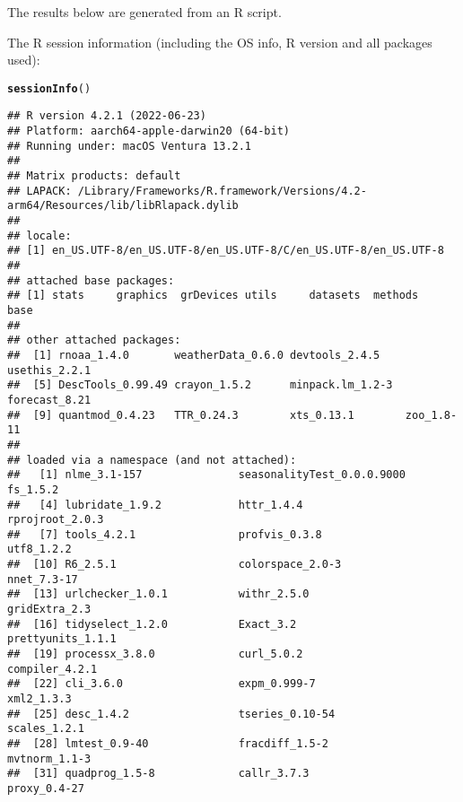 \documentclass{article}\usepackage[]{graphicx}\usepackage[]{xcolor}
\makeatletter
\newcommand{\hlstd}[1]{\textcolor[rgb]{0.345,0.345,0.345}{#1}}%
\newcommand{\hlkwd}[1]{\textcolor[rgb]{0.737,0.353,0.396}{\textbf{#1}}}%
\newenvironment{kframe}{%
 \def\at@end@of@kframe{}%
 \ifinner\ifhmode%
  \def\at@end@of@kframe{\end{minipage}}%
  \begin{minipage}{\columnwidth}%
 \fi\fi%
 \def\FrameCommand##1{\hskip\@totalleftmargin \hskip-\fboxsep
 \colorbox{shadecolor}{##1}\hskip-\fboxsep
     \hskip-\linewidth \hskip-\@totalleftmargin \hskip\columnwidth}%
 \MakeFramed {\advance\hsize-\width
   \@totalleftmargin\z@ \linewidth\hsize
   \@setminipage}}%
 {\par\unskip\endMakeFramed%
 \at@end@of@kframe}
\newenvironment{knitrout}{}{} %
\makeatother
\begin{document}
\title{\title{\title{\title{\title{}}}}}



\maketitle
The results below are generated from an R script.



The R session information (including the OS info, R version and all
packages used):

\begin{knitrout}
\color{fgcolor}\begin{kframe}
\begin{alltt}
\hlkwd{sessionInfo}\hlstd{()}
\end{alltt}
\begin{verbatim}
## R version 4.2.1 (2022-06-23)
## Platform: aarch64-apple-darwin20 (64-bit)
## Running under: macOS Ventura 13.2.1
## 
## Matrix products: default
## LAPACK: /Library/Frameworks/R.framework/Versions/4.2-arm64/Resources/lib/libRlapack.dylib
## 
## locale:
## [1] en_US.UTF-8/en_US.UTF-8/en_US.UTF-8/C/en_US.UTF-8/en_US.UTF-8
## 
## attached base packages:
## [1] stats     graphics  grDevices utils     datasets  methods   base     
## 
## other attached packages:
##  [1] rnoaa_1.4.0       weatherData_0.6.0 devtools_2.4.5    usethis_2.2.1    
##  [5] DescTools_0.99.49 crayon_1.5.2      minpack.lm_1.2-3  forecast_8.21    
##  [9] quantmod_0.4.23   TTR_0.24.3        xts_0.13.1        zoo_1.8-11       
## 
## loaded via a namespace (and not attached):
##   [1] nlme_3.1-157               seasonalityTest_0.0.0.9000 fs_1.5.2                  
##   [4] lubridate_1.9.2            httr_1.4.4                 rprojroot_2.0.3           
##   [7] tools_4.2.1                profvis_0.3.8              utf8_1.2.2                
##  [10] R6_2.5.1                   colorspace_2.0-3           nnet_7.3-17               
##  [13] urlchecker_1.0.1           withr_2.5.0                gridExtra_2.3             
##  [16] tidyselect_1.2.0           Exact_3.2                  prettyunits_1.1.1         
##  [19] processx_3.8.0             curl_5.0.2                 compiler_4.2.1            
##  [22] cli_3.6.0                  expm_0.999-7               xml2_1.3.3                
##  [25] desc_1.4.2                 tseries_0.10-54            scales_1.2.1              
##  [28] lmtest_0.9-40              fracdiff_1.5-2             mvtnorm_1.1-3             
##  [31] quadprog_1.5-8             callr_3.7.3                proxy_0.4-27              

\end{verbatim}
\end{kframe}
\end{knitrout}
\end{document}
